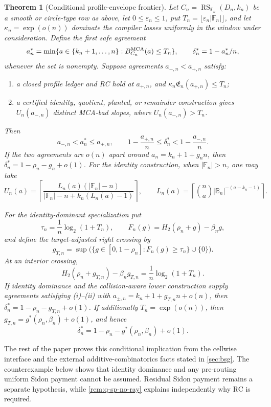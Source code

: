 \documentclass[11pt,a4paper]{amsart}
\numberwithin{equation}{section}
\newtheorem{theorem}{Theorem}[section]
\theoremstyle{remark}
\DeclareMathOperator{\RS}{RS}
\newcommand{\F}{\mathbb F}
\newcommand{\B}{\mathbb B}
\newcommand{\Eprof}{\mathfrak E}
\newcommand{\eps}{\varepsilon}
\begin{document}
\begin{theorem}[Conditional profile-envelope frontier]\label{thm:frontier}
Let \(C_n=\RS_{\F_n}(D_n,k_n)\) be a smooth or circle-type row as above,
let \(0\le\eps_n\le1\), put \(T_n=\lfloor\eps_n|\F_n|\rfloor\), and let
\(\kappa_n=\exp(o(n))\) dominate the compiler losses uniformly in the
window under consideration.  Define the first safe agreement
\[
 a_n^*=\min\{a\in\{k_n+1,\ldots,n\}:
                 B_{C_n}^{\rm MCA}(a)\le T_n\},
 \qquad \delta_n^*=1-a_n^*/n,
\]
whenever the set is nonempty.  Suppose agreements
\(a_{-,n}<a_{+,n}\) satisfy:
\begin{enumerate}[label=\textup{(\roman*)},leftmargin=2.4em]
\item a closed profile ledger and RC hold at \(a_{+,n}\), and
      \(\kappa_n\Eprof_n(a_{+,n})\le T_n\);
\item a certified identity, quotient, planted, or remainder construction
      gives \(U_n(a_{-,n})\) distinct MCA-bad slopes, where
      \(U_n(a_{-,n})>T_n\).
\end{enumerate}
Then
\[
 a_{-,n}<a_n^*\le a_{+,n},\qquad
 1-\frac{a_{+,n}}n\le\delta_n^*<1-\frac{a_{-,n}}n.
 \tag{1.2}\label{eq:threshold-bracket}
\]
If the two agreements are \(o(n)\) apart around
\(a_n=k_n+1+g_n n\), then
\(\delta_n^*=1-\rho_n-g_n+o(1)\).  For the identity construction, when
\(|\F_n|>n\), one may take
\[
 U_n(a)=
 \left\lceil
 \frac{L_n(a)(|\F_n|-n)}
      {|\F_n|-n+k_n(L_n(a)-1)}
 \right\rceil,\qquad
 L_n(a)=
 \left\lceil\binom na|\B_n|^{-(a-k_n-1)}\right\rceil .
\]

For the identity-dominant specialization put
\[
 \tau_n=\frac1n\log_2(1+T_n),\qquad
 F_n(g)=H_2(\rho_n+g)-\beta_ng,
\]
and define the target-adjusted right crossing by
\[
 g_{T,n}=\sup\bigl(\{g\in[0,1-\rho_n]:F_n(g)\ge\tau_n\}\cup\{0\}\bigr).
 \tag{1.3}\label{eq:target-crossing}
\]
At an interior crossing,
\[
 H_2(\rho_n+g_{T,n})-\beta_ng_{T,n}
   =\frac1n\log_2(1+T_n).
\]
If identity dominance and the collision-aware lower construction supply
agreements satisfying \textup{(i)--(ii)} with
\(a_{\pm,n}=k_n+1+g_{T,n}n+o(n)\), then
\(\delta_n^*=1-\rho_n-g_{T,n}+o(1)\).  If additionally
\(T_n=\exp(o(n))\), then \(g_{T,n}=g^*(\rho_n,\beta_n)+o(1)\), and hence
\[
 \delta_n^*=1-\rho_n-g^*(\rho_n,\beta_n)+o(1).
 \tag{1.4}\label{eq:identity-frontier}
\]
\end{theorem}

The rest of the paper proves this conditional implication from the
cellwise interface and the external additive-combinatorics facts stated in
\cref{sec:bsg}.  The counterexample below shows that identity dominance and
any pre-routing uniform Sidon payment cannot be assumed.  Residual Sidon
payment remains a separate hypothesis, while
\cref{rem:q-sp-no-ray} explains independently why RC is required.
\end{document}
